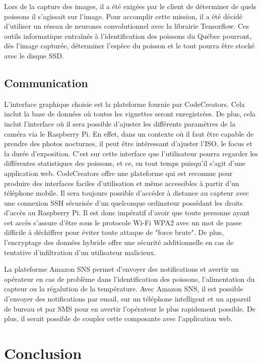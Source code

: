 Lors de la capture des images, il a été exigées par le client de déterminer de quels poissons il s'agissait sur l'image. Pour accomplir cette mission, il a été décidé d'utiliser un réseau de neurones convolutionnel avec la librairie Tensorflow. Ces outils informatique entraînés à l'identification des poissons du Québec pourront, dès l'image capturée, déterminer l'espèce du poisson et le tout pourra être stocké avec le disque SSD.

\subsection{Communication}

L'interface graphique choisie est la plateforme fournie par CodeCreators. Cela inclut la base de données où toutes les vignettes seront enregistrées. De plus, cela inclut l'interface où il sera possible d'ajuster les différents paramètres de la caméra via le Raspberry Pi. En effet, dans un contexte où il faut être capable de prendre des photos nocturnes, il peut être intéressant d'ajuster l'ISO, le focus et la durée d'exposition. C'est sur cette interface que l'utilisateur pourra regarder les différentes statistiques des poissons, et ce, en tout temps puisqu'il s'agit d'une application web. CodeCreators offre une plateforme qui est reconnue pour produire des interfaces faciles d'utilisation et même accessibles à partir d'un téléphone mobile. Il sera toujours possible d'accéder à distance au capteur avec une connexion SSH sécurisée d'un quelconque ordinateur possédant les droits d'accès au Raspberry Pi. Il est donc impératif d'avoir que toute personne ayant cet accès s'assure d'être sous le protocole  Wi-Fi WPA2 avec un mot de passe difficile à déchiffrer pour éviter toute attaque de "force brute". De plus, l'encryptage des données hybride offre une sécurité additionnelle en cas de tentative d'infiltration d'un utilisateur malicieux.

La plateforme Amazon SNS permet d'envoyer des notifications et avertir un opérateur en cas de problème dans l'identification des poissons, l'alimentation du capteur ou la régalution de la température. Avec Amazon SNS, il est possible d'envoyer des notifications par email, sur un téléphone intelligent et un appareil de bureau et par SMS pour en avertir l'opérateur le plus rapidement possible. De plus, il serait possible de coupler cette composante avec l'application web.


\section{Conclusion}

